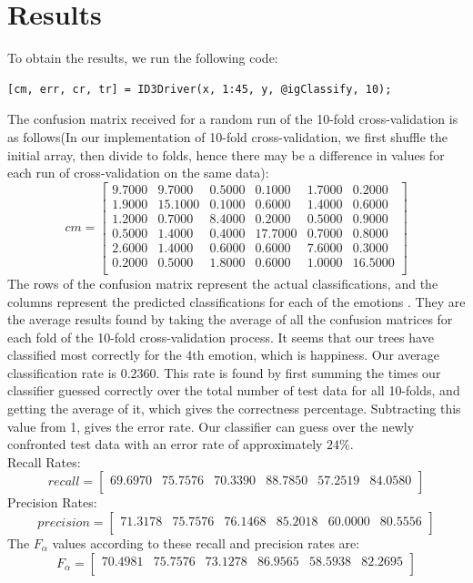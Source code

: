 \documentclass[11pt]{amsart}
\begin{document}
\section{Results}
To obtain the results, we run the following code:
\begin{lstlisting}
[cm, err, cr, tr] = ID3Driver(x, 1:45, y, @igClassify, 10);
\end{lstlisting}
The confusion matrix received for a random run of the 10-fold cross-validation is as follows(In our implementation of 10-fold cross-validation, we first shuffle the initial array, then divide to folds, hence there may be a difference in values for each run of cross-validation on the same data):
$$
cm = \left[\begin{array}{cccccc}
9.7000   & 9.7000 &   0.5000 &   0.1000 &   1.7000    &0.2000 \\
    1.9000   &15.1000&    0.1000&    0.6000&    1.4000 &   0.6000 \\
    1.2000    &0.7000    &8.4000    &0.2000    &0.5000   & 0.9000 \\
    0.5000    &1.4000    &0.4000   &17.7000   & 0.7000   & 0.8000 \\
    2.6000    &1.4000    &0.6000    &0.6000    &7.6000    &0.3000 \\
    0.2000    &0.5000    &1.8000    &0.6000    &1.0000   &16.5000 \\
\end{array}
\right]
$$
The rows of the confusion matrix represent the actual classifications, and the columns represent the predicted classifications for each of the emotions .  They are the average results found by taking the average of all the confusion matrices for each fold of the 10-fold cross-validation process. It seems that our trees have classified most correctly for the 4th emotion, which is happiness. Our average classification rate is   $0.2360$. This rate is found by first summing the times our classifier guessed correctly over the total number of test data for  all 10-folds, and getting the average of it, which gives the correctness percentage. Subtracting this value from 1, gives the error rate. Our classifier can guess over the newly confronted test data with an error rate of approximately $24\%$.  \\
Recall Rates:
$$
recall = \left[\begin{array}{cccccc}
69.6970   &75.7576 &  70.3390  & 88.7850 &  57.2519&   84.0580 \\
\end{array}
\right]
$$
Precision Rates:
$$
precision = \left[\begin{array}{cccccc}
71.3178 &   75.7576 &   76.1468 &   85.2018 &   60.0000 &   80.5556  \\
\end{array}
\right]
$$
The $F_{\alpha}$ values according to these recall and precision rates are: 
$$
F_{\alpha} = \left[\begin{array}{cccccc}
70.4981 &   75.7576 &   73.1278 &   86.9565 &   58.5938 &    82.2695 \\
\end{array}
\right]
$$
\end{document}
